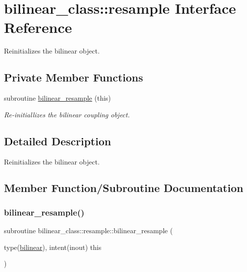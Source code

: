 \hypertarget{interfacebilinear__class_1_1resample}{}\section{bilinear\+\_\+class\+:\+:resample Interface Reference}
\label{interfacebilinear__class_1_1resample}


Reinitializes the bilinear object.  


\subsection*{Private Member Functions}
\begin{DoxyCompactItemize}
\item 
subroutine \hyperlink{interfacebilinear__class_1_1resample_a424743c4b7a64155b27f52c6791fea09}{bilinear\+\_\+resample} (this)
\begin{DoxyCompactList}\small\item\em Re-\/initiallizes the bilinear coupling object. \end{DoxyCompactList}\end{DoxyCompactItemize}


\subsection{Detailed Description}
Reinitializes the bilinear object. 

\subsection{Member Function/\+Subroutine Documentation}
\mbox{\label{interfacebilinear__class_1_1resample_a424743c4b7a64155b27f52c6791fea09}} 
\subsubsection{\texorpdfstring{bilinear\+\_\+resample()}{bilinear\_resample()}}
{\footnotesize\ttfamily subroutine bilinear\+\_\+class\+::resample\+::bilinear\+\_\+resample (\begin{DoxyParamCaption}\item[{type(\hyperlink{structbilinear__class_1_1bilinear}{bilinear}), intent(inout)}]{this }\end{DoxyParamCaption})\hspace{0.3cm}{\ttfamily [private]}}



